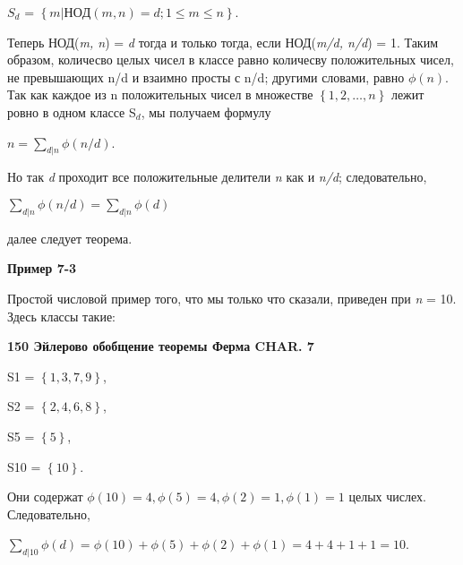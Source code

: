 \documentclass[12pt]{article}
\begin{document}
	\begin{center}
		$S_{d}$ = $\left\{m | НОД(m, n) = d; 1 \leq m \leq n\right\}$.	
	\end{center}
	
	
	Теперь НОД(\textit{m, n}) = \textit{d} тогда и только тогда, если  НОД(\textit{m/d, n/d}) = 1. Таким образом, количесво целых чисел в классе равно количесву положительных чисел, не превышающих  n/d и взаимно просты с n/d; другими словами, равно $\phi(n)$. Так как каждое из n положительных чисел в множестве $\left\{1, 2, … , n\right\}$ лежит ровно в одном классе S$_d$, мы получаем формулу
	
	\begin{center}
		$n = \sum_{d|n}\phi(n/d)$.	
	\end{center}
	
	
	Но так \textit{d} проходит все положительные делители \textit{n} как и \textit{n/d}; следовательно, 
	
	\begin{center}
		$\sum_{d|n}\phi(\textit{n/d}) = \sum_{d|n}\phi(\textit{d})$	
	\end{center}
	
	
	далее следует теорема.
	
	\begin{flushleft}
		\textbf{Пример 7-3}
	\end{flushleft}

	
	Простой числовой пример того, что мы только что сказали, приведен при \textit{n} = 10. Здесь классы такие:
	
	\begin{center}
		\textbf{150  \hspace{4cm} Эйлерово обобщение теоремы Ферма \hspace{4cm} CHAR. 7}
	\end{center}

		\begin{center}
			S1 = $\left\{1, 3, 7, 9\right\}$,
			
			S2 = $\left\{2, 4, 6, 8\right\}$,
			
			S5 = $\left\{5\right\}$,
			
			S10 = $\left\{10\right\}$.	
		\end{center}				
	
	
	Они содержат $\phi(10) = 4, \phi(5) = 4, \phi(2) = 1, \phi(1) = 1$ целых числех. Следовательно, 
	
	\begin{center}
		$\sum_{d|10}\phi(\textit{d}) = \phi(10) + \phi(5) + \phi(2) + \phi(1) = 4 + 4 + 1 + 1 = 10$.	
	\end{center}
	
\end{document}
